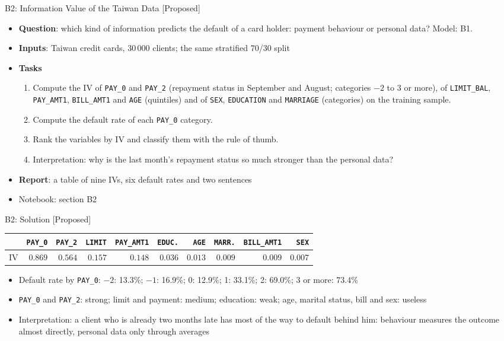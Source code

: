 \begin{frame}{B2: Information Value of the Taiwan Data [Proposed]}
\itemsize{\footnotesize}
\begin{itemize}
\item \textbf{Question}: which kind of information predicts the default of a card holder: payment behaviour or personal data? Model: B1.
\item \textbf{Inputs}: Taiwan credit cards, 30\,000 clients; the same stratified 70/30 split
\item \textbf{Tasks}
\begin{enumerate}
    \item Compute the IV of \texttt{PAY\_0} and \texttt{PAY\_2} (repayment status in September and August; categories $-2$ to 3 or more), of \texttt{LIMIT\_BAL}, \texttt{PAY\_AMT1}, \texttt{BILL\_AMT1} and \texttt{AGE} (quintiles) and of \texttt{SEX}, \texttt{EDUCATION} and \texttt{MARRIAGE} (categories) on the training sample.
    \item Compute the default rate of each \texttt{PAY\_0} category.
    \item Rank the variables by IV and classify them with the rule of thumb.
    \item Interpretation: why is the last month's repayment status so much stronger than the personal data?
\end{enumerate}
\item \textbf{Report}: a table of nine IVs, six default rates and two sentences
\item Notebook: section B2
\end{itemize}
\end{frame}

\ifsolutions
\begin{frame}{B2: Solution [Proposed]}
\itemsize{\footnotesize}
\begin{center}
\scriptsize
\begin{tabular}{lrrrrrrrrr}
\toprule
& \texttt{PAY\_0} & \texttt{PAY\_2} & \texttt{LIMIT} & \texttt{PAY\_AMT1} & \texttt{EDUC.} & \texttt{AGE} & \texttt{MARR.} & \texttt{BILL\_AMT1} & \texttt{SEX} \\
\midrule
IV & $0.869$ & $0.564$ & $0.157$ & $0.148$ & $0.036$ & $0.013$ & $0.009$ & $0.009$ & $0.007$ \\
\bottomrule
\end{tabular}
\end{center}
\begin{itemize}
    \item Default rate by \texttt{PAY\_0}: $-2$: 13.3\%; $-1$: 16.9\%; 0: 12.9\%; 1: 33.1\%; 2: 69.0\%; 3 or more: 73.4\%
    \item \texttt{PAY\_0} and \texttt{PAY\_2}: strong; limit and payment: medium; education: weak; age, marital status, bill and sex: useless
    \item Interpretation: a client who is already two months late has most of the way to default behind him: behaviour measures the outcome almost directly, personal data only through averages
\end{itemize}
\end{frame}
\fi

